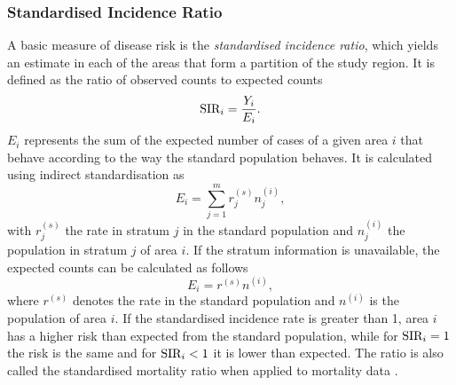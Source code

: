 \subsubsection{Standardised Incidence Ratio}
A basic measure of disease risk is the \textit{standardised incidence ratio}, which yields an estimate in each of the areas that form a partition of the study region. It is defined as the ratio of observed counts to expected counts
\begin{equation}\label{eq:sir}
    \hbox{SIR}_i = \frac{Y_i}{E_i}.
\end{equation}
$E_i$ represents the sum of the expected number of cases of a given area $i$ that behave according to the way the standard population behaves. It is calculated using indirect standardisation as
\begin{equation}
    E_i=\sum_{j=1}^mr_j^{(s)}n_j^{(i)},
\end{equation}
with $r_j^{(s)}$ the rate in stratum $j$ in the standard population and $n_j^{(i)}$ the population in stratum $j$ of area $i$. If the stratum information is unavailable, the expected counts can be calculated as follows
\begin{equation*}
    E_i = r^{(s)}n^{(i)},
\end{equation*}
where $r^{(s)}$ denotes the rate in the standard population and $n^{(i)}$ is the population of area $i$. If the standardised incidence rate is greater than 1, area $i$ has a higher risk than expected from the standard population, while for $\hbox{SIR}_i = 1$ the risk is the same and for $\hbox{SIR}_i < 1$ it is lower than expected. The ratio is also called the standardised mortality ratio when applied to mortality data \autocite[][]{moraga2019geospatial}.
